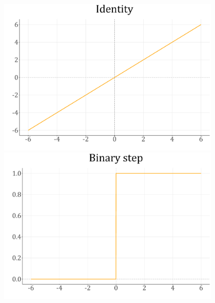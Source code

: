 \documentclass[spanish,a4paper,12pt,twoside]{report}
\begin{document}
    \begin{figure}[H]
      \begin{minipage}{0.49\textwidth}
        \centering
        \includegraphics[width = 1\linewidth]{resources/Fig12_1.pdf}
      \end{minipage}
      \begin{minipage}{0.49\textwidth}
        \centering
        \includegraphics[width = 1\linewidth]{resources/Fig12_2.pdf}
      \end{minipage}
    \end{figure} \vfill
\end{document}
